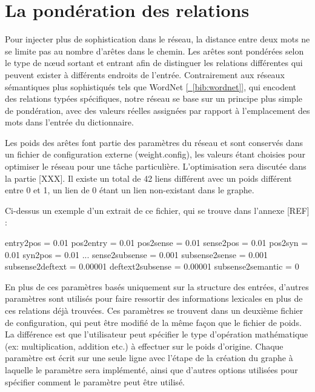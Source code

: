 \section{La pondération des relations}

Pour injecter plus de sophistication dans le réseau, la distance entre deux mots 
ne se limite pas au nombre d'arêtes dans le chemin. Les arêtes sont pondérées 
selon le type de nœud sortant et entrant afin de distinguer les relations 
différentes qui peuvent exister à différents endroits de l'entrée. Contrairement 
aux réseaux sémantiques plus sophistiqués tels que WordNet 
\hyperref[bib:wordnet]{[~\ref*{bib:wordnet}]}, qui encodent des relations typées 
spécifiques, notre réseau se base sur un principe plus simple de pondération, 
avec des valeurs réelles assignées par rapport à l'emplacement des mots dans 
l'entrée du dictionnaire.

Les poids des arêtes font partie des paramètres du réseau et sont conservés 
dans un fichier de configuration externe (weight.config), les valeurs étant 
choisies pour optimiser le réseau pour une tâche particulière. L'optimisation 
sera discutée dans la partie [XXX]. Il existe un total de 42 liens différent 
avec un poids différent entre 0 et 1, un lien de 0 étant un 
lien non-existant dans le graphe.

Ci-dessus un exemple d'un extrait de ce fichier, qui se trouve dans l'annexe [REF] :

\begin{framed}
entry2pos = 0.01\newline
pos2entry = 0.01\newline
pos2sense = 0.01\newline
sense2pos = 0.01\newline
pos2syn = 0.01\newline
syn2pos = 0.01\newline
...\newline
sense2subsense = 0.001\newline
subsense2sense = 0.001\newline
subsense2deftext = 0.00001\newline
deftext2subsense = 0.00001\newline
subsense2semantic = 0\newline
\end{framed}

En plus de ces paramètres basés uniquement sur la structure des entrées, 
d'autres paramètres sont utilisés pour faire ressortir des informations 
lexicales en plus de ces relations déjà trouvées. Ces paramètres se trouvent 
dans un deuxième fichier de configuration, qui peut être modifié de la même 
façon que le fichier de poids. La différence est que l'utilisateur peut 
spécifier le type d'opération mathématique (ex: multiplication, addition etc.) à effectuer sur le poids d'origine. Chaque paramètre est écrit sur une seule ligne avec l'étape de la création du graphe à 
laquelle le paramètre sera implémenté, ainsi que d'autres options utilisées pour 
spécifier comment le paramètre peut être utilisé.

